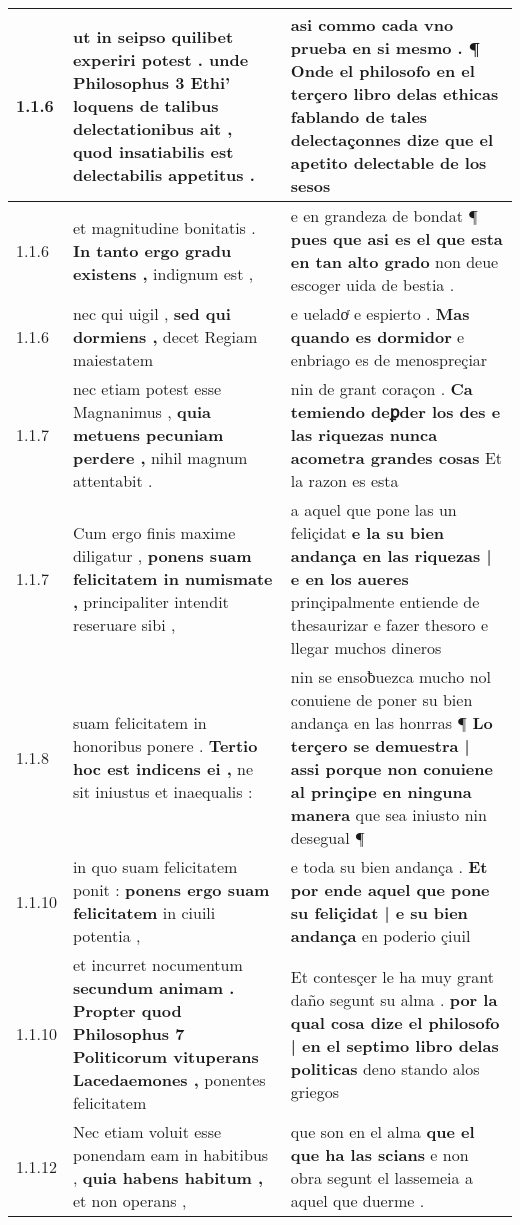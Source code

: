 \begin{tabular}{|p{1cm}|p{6.5cm}|p{6.5cm}|}
1.1.6 & ut in seipso quilibet experiri potest . \textbf{ unde Philosophus 3 Ethi’ loquens de talibus delectationibus ait , } quod insatiabilis est delectabilis appetitus . & asi commo cada vno prueba en si mesmo . \textbf{ ¶ Onde el philosofo en el terçero libro delas ethicas fablando de tales delectaçonnes dize } que el apetito delectable de los sesos \\\hline
1.1.6 & et magnitudine bonitatis . \textbf{ In tanto ergo gradu existens , } indignum est , & e en grandeza de bondat ¶ \textbf{ pues que asi es el que esta en tan alto grado } non deue escoger uida de bestia . \\\hline
1.1.6 & nec qui uigil , \textbf{ sed qui dormiens , } decet Regiam maiestatem & e ueladoͬ e espierto . \textbf{ Mas quando es dormidor } e enbriago es de menospreçiar \\\hline
1.1.7 & nec etiam potest esse Magnanimus , \textbf{ quia metuens pecuniam perdere , } nihil magnum attentabit . & nin de grant coraçon . \textbf{ Ca temiendo deꝑder los des e las riquezas nunca acometra grandes cosas } Et la razon es esta \\\hline
1.1.7 & Cum ergo finis maxime diligatur , \textbf{ ponens suam felicitatem in numismate , } principaliter intendit reseruare sibi , & a aquel que pone las un feliçidat \textbf{ e la su bien andança en las riquezas | e en los aueres } prinçipalmente entiende de thesaurizar e fazer thesoro e llegar muchos dineros \\\hline
1.1.8 & suam felicitatem in honoribus ponere . \textbf{ Tertio hoc est indicens ei , } ne sit iniustus et inaequalis : & nin se ensoƀuezca mucho nol conuiene de poner su bien andança en las honrras ¶ \textbf{ Lo terçero se demuestra | assi porque non conuiene al prinçipe en ninguna manera } que sea iniusto nin desegual ¶ \\\hline
1.1.10 & in quo suam felicitatem ponit : \textbf{ ponens ergo suam felicitatem } in ciuili potentia , & e toda su bien andança . \textbf{ Et por ende aquel que pone su feliçidat | e su bien andança } en poderio çiuil \\\hline
1.1.10 & et incurret nocumentum \textbf{ secundum animam . Propter quod Philosophus 7 Politicorum vituperans Lacedaemones , } ponentes felicitatem & Et contesçer le ha muy grant daño segunt su alma . \textbf{ por la qual cosa dize el philosofo | en el septimo libro delas politicas } deno stando alos griegos \\\hline
1.1.12 & Nec etiam voluit esse ponendam eam in habitibus , \textbf{ quia habens habitum , } et non operans , & que son en el alma \textbf{ que el que ha las scians } e non obra segunt el lassemeia a aquel que duerme . \\\hline

\end{tabular}
